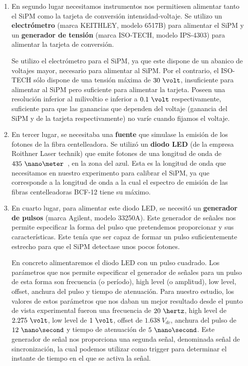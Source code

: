 \begin{enumerate}
\item {} En segundo lugar necesitamos instrumentos nos permitiesen alimentar tanto el SiPM como la tarjeta de conversión intensidad-voltaje. Se utilizo  un \textbf{electrómetro} (marca KEITHLEY, modelo 6517B) para alimentar el SiPM y un \textbf{generador de tensión} (marca ISO-TECH, modelo IPS-4303) para alimentar la tarjeta de conversión.

Se utilizo el electrómetro para el SiPM, ya que este dispone de un abanico de voltajes mayor, necesario para alimentar al SiPM. Por el contrario, el ISO-TECH sólo dispone de una tensión máxima de $30~\volt$, insuficiente para alimentar al SiPM pero suficiente para alimentar la tarjeta. Poseen una resolución  inferior al milivoltio e inferior a $0.1~\volt$ respectivamente, suficiente para que las ganancias que dependen del voltaje (ganancia del SiPM y de la tarjeta respectivamente) no varíe cuando fijamos el voltaje.

\item {} En tercer lugar, se necesitaba una \textbf{fuente} que simulase la emisión de los fotones de la fibra centelleadora. 
\newline
Se utilizó un \textbf{diodo LED} (de la empresa Roithner Laser technik) que emite fotones de una longitud de onda de $435~\nano\meter$~\cite{datasheetLED}, en la zona del azul. Esta es la longitud de onda que necesitamos en nuestro experimento para calibrar el SiPM, ya que corresponde a la longitud de onda a la cual el espectro de emisión de las fibras centelleadoras BCF-12 tiene su máximo.

\item {} En cuarto lugar, para alimentar este diodo LED, se necesitó un \textbf{generador de pulsos} (marca Agilent, modelo 33250A). Este generador de señales nos permite especificar la forma del pulso que pretendemos proporcionar y sus características. Este tenía que ser capaz de formar un pulso suficientemente estrecho para que el SiPM detectase unos pocos fotones. 

En concreto alimentaremos el diodo LED con un pulso cuadrado. Los parámetros que nos permite especificar el generador de señales para un pulso de esta forma son frecuencia (o período), high level (o amplitud), low level, offset, anchura del pulso y tiempo de atenuación. Para nuestro estudio, los valores de estos parámetros que nos daban un mejor resultado desde el punto de vista experimental fueron una frecuencia de $20~\hertz$, high level de $2.275~\volt$, low level de $1~\volt$, offset de $1.638~V_{dc}$, anchura del pulso de $12~\nano\second$ y tiempo de atenuación de $5~\nano\second$.
Este generador de señal nos proporciona una segunda señal, denominada señal de sincronización, la cual podemos utilizar como trigger para determinar el instante de tiempo en el que se activa la señal.


\end{enumerate}
